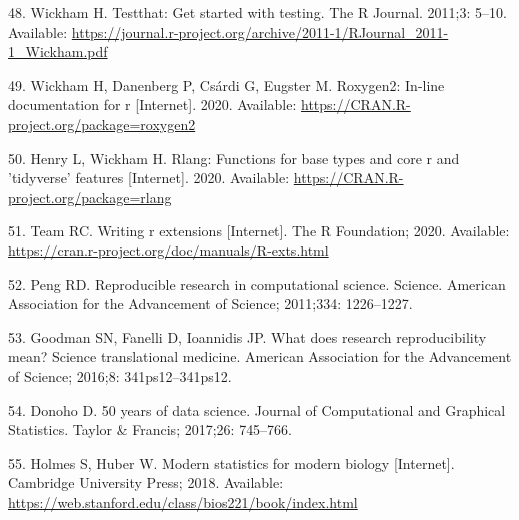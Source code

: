 \documentclass[10pt,letterpaper]{article}
\begin{document}
\leavevmode\hypertarget{ref-testthat}{}%
48. Wickham H. Testthat: Get started with testing. The R Journal.
2011;3: 5--10. Available:
\url{https://journal.r-project.org/archive/2011-1/RJournal_2011-1_Wickham.pdf}

\leavevmode\hypertarget{ref-roxygen2}{}%
49. Wickham H, Danenberg P, Csárdi G, Eugster M. Roxygen2: In-line
documentation for r {[}Internet{]}. 2020. Available:
\url{https://CRAN.R-project.org/package=roxygen2}

\leavevmode\hypertarget{ref-rlang}{}%
50. Henry L, Wickham H. Rlang: Functions for base types and core r and
'tidyverse' features {[}Internet{]}. 2020. Available:
\url{https://CRAN.R-project.org/package=rlang}

\leavevmode\hypertarget{ref-Rcore2020}{}%
51. Team RC. Writing r extensions {[}Internet{]}. The R Foundation;
2020. Available:
\url{https://cran.r-project.org/doc/manuals/R-exts.html}

\leavevmode\hypertarget{ref-peng2011}{}%
52. Peng RD. Reproducible research in computational science. Science.
American Association for the Advancement of Science; 2011;334:
1226--1227.

\leavevmode\hypertarget{ref-goodman2016}{}%
53. Goodman SN, Fanelli D, Ioannidis JP. What does research
reproducibility mean? Science translational medicine. American
Association for the Advancement of Science; 2016;8: 341ps12--341ps12.

\leavevmode\hypertarget{ref-donoho2017}{}%
54. Donoho D. 50 years of data science. Journal of Computational and
Graphical Statistics. Taylor \& Francis; 2017;26: 745--766.

\leavevmode\hypertarget{ref-holmes2018}{}%
55. Holmes S, Huber W. Modern statistics for modern biology
{[}Internet{]}. Cambridge University Press; 2018. Available:
\url{https://web.stanford.edu/class/bios221/book/index.html}

\nolinenumbers
\end{document}
